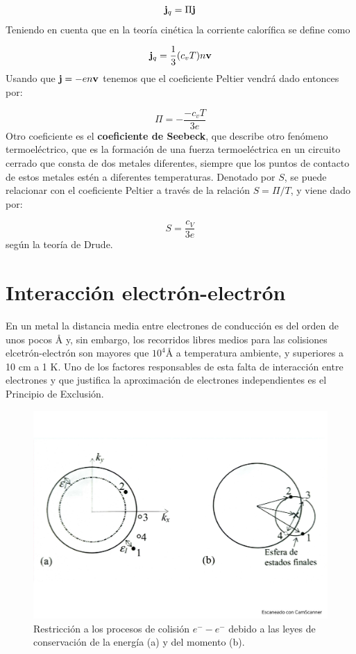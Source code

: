\begin{equation}
	\mathbf{j}_q = \Pi \mathbf{j}
\end{equation}
Teniendo en cuenta que en la teoría cinética la corriente calorífica se define como

\begin{equation}
	\mathbf{j}_q = \frac{1}{3} (c_v T) n \mathbf{v}
\end{equation}
Usando que $\mathbf{j}=-en\mathbf{v}$ tenemos que el coeficiente Peltier vendrá dado entonces por:

\begin{equation}
	\Pi = - \frac{-c_v T}{3e}
\end{equation}
Otro coeficiente es el \textbf{coeficiente de Seebeck}, que describe otro fenómeno termoeléctrico, que es la formación de una fuerza termoeléctrica en un circuito cerrado que consta de dos metales diferentes, siempre que los puntos de contacto de estos metales estén a diferentes temperaturas. Denotado por $S$, se puede relacionar con el coeficiente Peltier a través de la relación $S=\Pi/T$, y viene dado por:

\begin{equation}
	S = \frac{c_V}{3e}
\end{equation}
según la teoría de Drude. 

\section{Interacción electrón-electrón}

En un metal la distancia media entre electrones de conducción es del orden de unos pocos $\unit{\angstrom}$ y, sin embargo, los recorridos libres medios para las colisiones elcetrón-electrón son mayores que $10^4 \unit{\angstrom}$ a temperatura ambiente, y superiores a 10 cm a 1 K. Uno de los factores responsables de esta falta de interacción entre electrones y que justifica la aproximación de electrones independientes es el Principio de Exclusión.

\begin{figure}[h!] \centering
	\includegraphics[scale=0.35]{Cuerpo/Ch_06/Fotos libro 4.pdf}
	\caption{Restricción a los procesos de colisión $e^- - e^-$ debido a las leyes de conservación de la energía (a) y del momento (b).}
	\label{Fig:06-04}
\end{figure}  

